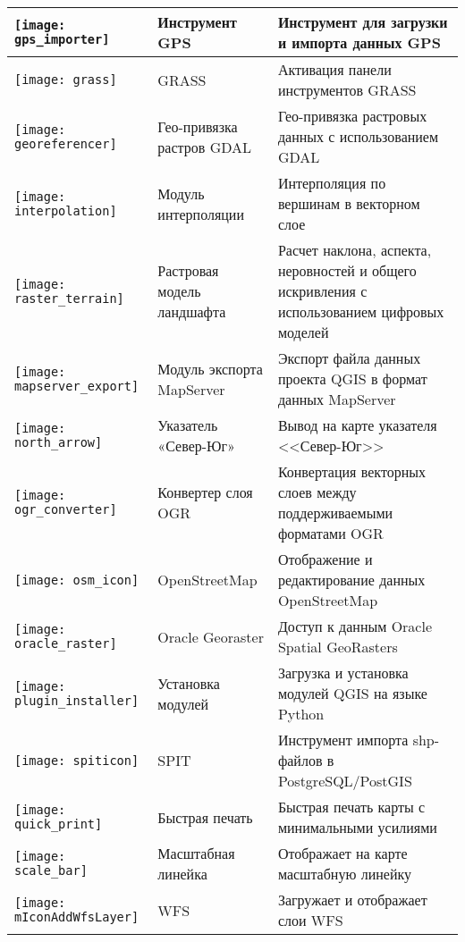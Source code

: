 {\begin{longtable}{|p{1.2cm}|p{3.8cm}|p{10.5cm}|}
\hline
\texttt{[image: gps\_importer]}
 & Инструмент GPS \index{plugins!gps}& Инструмент для загрузки и импорта данных GPS\\
\hline
\texttt{[image: grass]}
 & GRASS \index{plugin!grass toolbox} & Активация панели инструментов GRASS\\
\hline
\texttt{[image: georeferencer]}
 & Гео-привязка растров GDAL \index{plugin!georeferencer} & Гео-привязка растровых данных с использованием GDAL\\
\hline
\texttt{[image: interpolation]}
& Модуль интерполяции \index{plugins!Interpolation}& Интерполяция по вершинам в векторном слое\\
\hline
\texttt{[image: raster\_terrain]}
& Растровая модель ландшафта \index{plugins!Raster Terrain Modelling}& Расчет наклона, аспекта,
неровностей и общего искривления с использованием цифровых моделей\\
\hline
\texttt{[image: mapserver\_export]}
& Модуль экспорта MapServer \index{plugins!MapServer Export}& Экспорт файла данных проекта QGIS в формат данных MapServer \\
\hline
\texttt{[image: north\_arrow]}
& Указатель «Север-Юг» \index{plugins!north arrow}& Вывод на карте указателя <<Север-Юг>>\\
\hline
\texttt{[image: ogr\_converter]}
 & Конвертер слоя OGR \index{plugins!OGR converter} & Конвертация векторных слоев между поддерживаемыми форматами  OGR\\
\hline
\texttt{[image: osm\_icon]}
 & OpenStreetMap & Отображение и редактирование данных  OpenStreetMap\\
\hline
\texttt{[image: oracle\_raster]}
 & Oracle Georaster \index{plugins!georaster}& Доступ к данным  Oracle Spatial GeoRasters\\
\hline
\texttt{[image: plugin\_installer]}
 & Установка модулей \index{plugins!Plugin Installer} & Загрузка и установка модулей QGIS на языке Python\\
\hline
\texttt{[image: spiticon]}
 & SPIT \index{plugins!spit}& Инструмент импорта shp-файлов в  PostgreSQL/PostGIS\\
\hline
\texttt{[image: quick\_print]}
 & Быстрая печать \index{plugins!quick print}& Быстрая печать карты с минимальными усилиями\\
\hline
\texttt{[image: scale\_bar]}
 & Масштабная линейка \index{plugins!scalebar}& Отображает на карте масштабную линейку\\
\hline
\texttt{[image: mIconAddWfsLayer]}
 & WFS & Загружает и отображает слои WFS\\
\hline
\end{longtable}}
